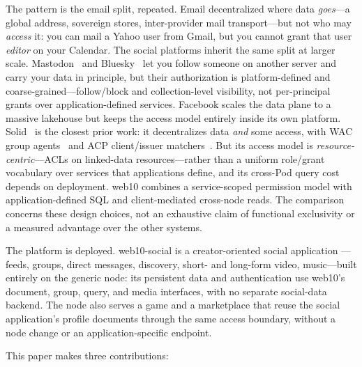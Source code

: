 \documentclass[sigconf, nonacm]{acmart}
\begin{document}
The pattern is the email split, repeated. Email decentralized where data
\emph{goes}---a global address, sovereign stores, inter-provider mail transport---but
not who may \emph{access} it: you can mail a Yahoo user from Gmail, but you
cannot grant that user \emph{editor} on your Calendar. The social platforms
inherit the same split at larger scale. Mastodon~\cite{activitypub2018} and
Bluesky~\cite{kleppmann2024} let you follow someone on another server and carry
your data in principle, but their authorization is platform-defined and
coarse-grained---follow/block and collection-level visibility, not per-principal
grants over application-defined services. Facebook scales the data plane to a
massive lakehouse but keeps the access model entirely inside its own platform.
Solid~\cite{solid2016} is the closest prior work: it decentralizes data
\emph{and} some access, with WAC group agents~\cite{wac2022} and ACP
client/issuer matchers~\cite{acp2022}. But its access model is
\emph{resource-centric}---ACLs on linked-data resources---rather than a uniform
role/grant vocabulary over services that applications define, and its cross-Pod
query cost depends on deployment. web10 combines a service-scoped permission
model with application-defined SQL and client-mediated cross-node reads.
The comparison concerns these design choices, not an exhaustive claim of
functional exclusivity or a measured advantage over the other systems.

The platform is deployed. web10-social is a creator-oriented social application
---feeds, groups, direct messages, discovery, short- and long-form video,
music---built entirely on the generic node: its persistent data and
authentication use web10's document, group, query, and media interfaces, with
no separate social-data backend. The node also serves a game and a marketplace
that reuse the social application's profile documents through the same access
boundary, without a node change or an application-specific endpoint.

This paper makes three contributions:
\end{document}
